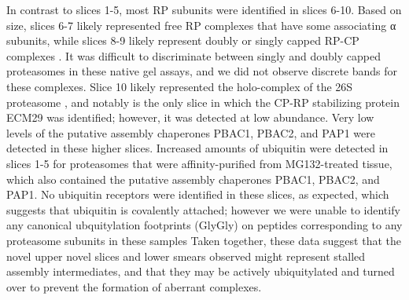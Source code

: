 	In contrast to slices 1-5, most RP subunits were identified in slices 6-10. Based on size, slices 6-7 likely represented free RP complexes that have some associating α subunits, while slices 8-9 likely represent doubly or singly capped RP-CP complexes \citep{book10}. It was difficult to discriminate between singly and doubly capped proteasomes in these native gel assays, and we did not observe discrete bands for these complexes. Slice 10 likely represented the holo-complex of the 26S proteasome \citep{book10}, and notably is the only slice in which the CP-RP stabilizing protein ECM29 was identified; however, it was detected at low abundance. Very low levels of the putative assembly chaperones PBAC1, PBAC2, and PAP1 were detected in these higher slices. Increased amounts of ubiquitin were detected in slices 1-5 for proteasomes that were affinity-purified from MG132-treated tissue, which also contained the putative assembly chaperones PBAC1, PBAC2, and PAP1. No ubiquitin receptors were identified in these slices, as expected, which suggests that ubiquitin is covalently attached; however we were unable to identify any canonical ubquitylation footprints (GlyGly)  on peptides corresponding to any proteasome subunits in these samples  Taken together, these data suggest that the novel upper novel slices and lower smears observed might represent stalled assembly intermediates, and that they may be actively ubiquitylated and turned over to prevent the formation of aberrant complexes.
 
